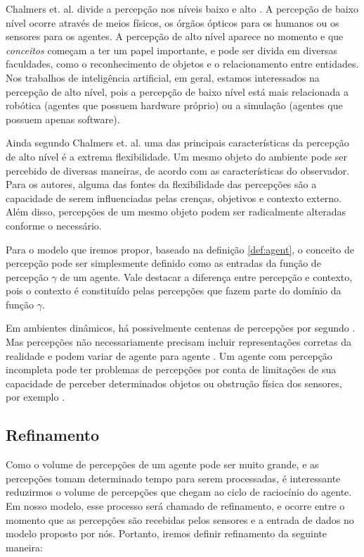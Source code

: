 Chalmers et. al. divide a percepção nos níveis baixo e alto \cite{chalmers1992high}. A percepção de baixo nível ocorre através de meios físicos, os órgãos ópticos para os humanos ou os sensores para os agentes. A percepção de alto nível aparece no momento e que \textit{conceitos} começam a ter um papel importante, e pode ser divida em diversas faculdades, como o reconhecimento de objetos e o relacionamento entre entidades. Nos trabalhos de inteligência artificial, em geral, estamos interessados na percepção de alto nível, pois a percepção de baixo nível está mais relacionada a robótica (agentes que possuem hardware próprio) ou a simulação (agentes que possuem apenas software).

Ainda segundo Chalmers et. al. uma das principais características da percepção de alto nível é a extrema flexibilidade. Um mesmo objeto do ambiente pode ser percebido de diversas maneiras, de acordo com as características do observador. Para os autores, alguma das fontes da flexibilidade das percepções são a capacidade de serem influenciadas pelas crenças, objetivos e contexto externo. Além disso, percepções de um mesmo objeto podem ser radicalmente alteradas conforme o necessário.

Para o modelo que iremos propor, baseado na definição \ref{def:agent}, o conceito de percepção pode ser simplesmente definido como as entradas da função de percepção $\gamma$ de um agente. Vale destacar a diferença entre percepção e contexto, pois o contexto é constituído pelas percepções que fazem parte do domínio da função $\gamma$.

Em ambientes dinâmicos, há possivelmente centenas de percepções por segundo \cite{hayes1992guardian}. Mas percepções não necessariamente precisam incluir representações corretas da realidade e podem variar de agente para agente \cite{janssen2005agent}. Um agente com percepção incompleta pode ter problemas de percepções por conta de limitações de sua capacidade de perceber determinados objetos ou obstrução física dos sensores, por exemplo \cite{chrisman1991intelligent}.

\subsection{Refinamento}

Como o volume de percepções de um agente pode ser muito grande, e as percepções tomam determinado tempo para serem processadas, é interessante reduzirmos o volume de percepções que chegam ao ciclo de raciocínio do agente. Em nosso modelo, esse processo será chamado de refinamento, e ocorre entre o momento que as percepções são recebidas pelos sensores e a entrada de dados no modelo proposto por nós. Portanto, iremos definir refinamento da seguinte maneira:

